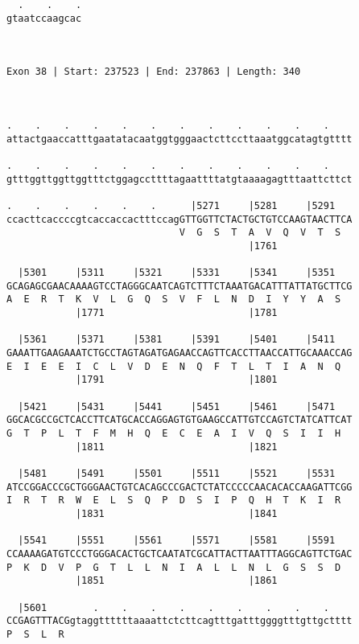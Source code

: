 \documentclass{article}
\begin{document}
\begin{Verbatim}
  .    .    .
gtaatccaagcac
             
             
 
Exon 38 | Start: 237523 | End: 237863 | Length: 340



.    .    .    .    .    .    .    .    .    .    .    .    
attactgaaccatttgaatatacaatggtgggaactcttccttaaatggcatagtgtttt
                                                            
.    .    .    .    .    .    .    .    .    .    .    .    
gtttggttggttggtttctggagccttttagaattttatgtaaaagagtttaattcttct
                                                            
.    .    .    .    .    .      |5271     |5281     |5291   
ccacttcaccccgtcaccaccactttccagGTTGGTTCTACTGCTGTCCAAGTAACTTCA
                              V  G  S  T  A  V  Q  V  T  S  
                                          |1761             
  
  |5301     |5311     |5321     |5331     |5341     |5351   
GCAGAGCGAACAAAAGTCCTAGGGCAATCAGTCTTTCTAAATGACATTTATTATGCTTCG
A  E  R  T  K  V  L  G  Q  S  V  F  L  N  D  I  Y  Y  A  S  
            |1771                         |1781             
  
  |5361     |5371     |5381     |5391     |5401     |5411   
GAAATTGAAGAAATCTGCCTAGTAGATGAGAACCAGTTCACCTTAACCATTGCAAACCAG
E  I  E  E  I  C  L  V  D  E  N  Q  F  T  L  T  I  A  N  Q  
            |1791                         |1801             
  
  |5421     |5431     |5441     |5451     |5461     |5471   
GGCACGCCGCTCACCTTCATGCACCAGGAGTGTGAAGCCATTGTCCAGTCTATCATTCAT
G  T  P  L  T  F  M  H  Q  E  C  E  A  I  V  Q  S  I  I  H  
            |1811                         |1821             
  
  |5481     |5491     |5501     |5511     |5521     |5531   
ATCCGGACCCGCTGGGAACTGTCACAGCCCGACTCTATCCCCCAACACACCAAGATTCGG
I  R  T  R  W  E  L  S  Q  P  D  S  I  P  Q  H  T  K  I  R  
            |1831                         |1841             
  
  |5541     |5551     |5561     |5571     |5581     |5591   
CCAAAAGATGTCCCTGGGACACTGCTCAATATCGCATTACTTAATTTAGGCAGTTCTGAC
P  K  D  V  P  G  T  L  L  N  I  A  L  L  N  L  G  S  S  D  
            |1851                         |1861             
  
  |5601        .    .    .    .    .    .    .    .    .    
CCGAGTTTACGgtaggttttttaaaattctcttcagtttgatttggggtttgttgctttt
P  S  L  R                                                  
                                                            

\end{Verbatim}
\end{document}
